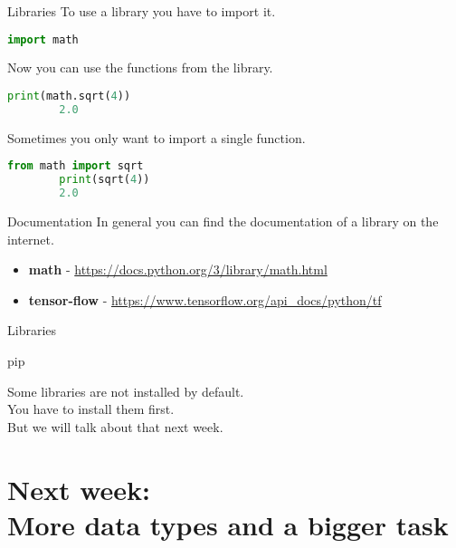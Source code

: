 \documentclass{beamer}
\begin{document}
\begin{frame}[fragile]{Libraries}
    To use a library you have to import it.\\ \pause
    \begin{lstlisting}[backgroundcolor = \color{lightgray},language=Python]
        import math
    \end{lstlisting}
    \pause
    Now you can use the functions from the library.\\ \pause
    \begin{lstlisting}[backgroundcolor = \color{lightgray},language=Python]
        print(math.sqrt(4))
        2.0
    \end{lstlisting}
    Sometimes you only want to import a single function.\\ \pause
    \begin{lstlisting}[backgroundcolor = \color{lightgray},language=Python]
        from math import sqrt
        print(sqrt(4))
        2.0
    \end{lstlisting}
\end{frame}

\begin{frame}{Documentation}
    In general you can find the documentation of a library on the internet.\\ \pause
    \begin{itemize}
        \item \textbf{math} - \href{https://docs.python.org/3/library/math.html}{https://docs.python.org/3/library/math.html}
        \item \textbf{tensor-flow} - \href{https://www.tensorflow.org/api\_docs/python/tf}{https://www.tensorflow.org/api\_docs/python/tf}
    \end{itemize}
\end{frame}



\begin{frame}{Libraries}
    \begin{alertblock}{pip}

    \end{alertblock}
    Some libraries are not installed by default.\\
    You have to install them first.\\ \pause    
    But we will talk about that next week.
\end{frame}

\section{Next week:\\
 More data types and a bigger task}
\end{document}
